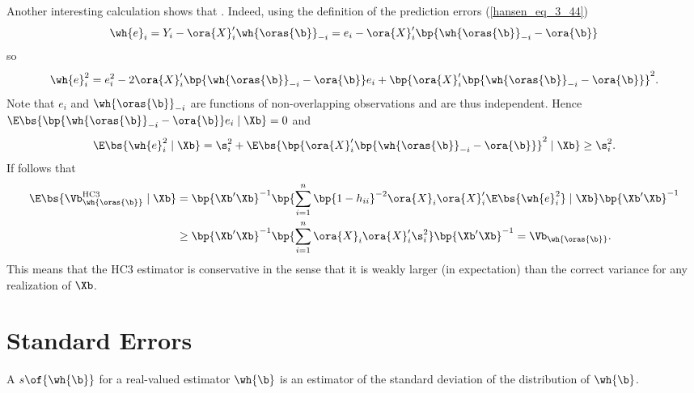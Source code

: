 
Another interesting calculation shows that . Indeed, using the definition of the prediction errors (\ref{hansen_eq_3_44})
\begin{equation}
    \notag
    \wh{e}_i = Y_i - \ora{X}_i^\prime \wh{\oras{\b}}_{-i} = e_i - \ora{X}_i^\prime \bp{\wh{\oras{\b}}_{-i} - \ora{\b}}
\end{equation}
so 
\begin{equation}
    \notag
    \wh{e}_i^2 = e_i^2 - 2 \ora{X}_i^\prime \bp{\wh{\oras{\b}}_{-i} - \ora{\b}} e_i + \bp{\ora{X}_i^\prime \bp{\wh{\oras{\b}}_{-i} - \ora{\b}}}^2.
\end{equation}
Note that $e_i$ and $\wh{\oras{\b}}_{-i}$ are functions of non-overlapping observations and are thus independent. Hence $\E\bs{\bp{\wh{\oras{\b}}_{-i} - \ora{\b}} e_i \mid \Xb} = 0$ and 
\begin{equation}
    \notag
    \E\bs{\wh{e}_i^2 \mid \Xb} = \s_i^2 + \E\bs{\bp{\ora{X}_i^\prime \bp{\wh{\oras{\b}}_{-i} - \ora{\b}}}^2 \mid \Xb} \geq \s_i^2.
\end{equation}
If follows that 
\begin{equation}
    \notag
    \begin{aligned}
        \E\bs{\Vb_{\wh{\oras{\b}}}^{\text{HC3}} \mid \Xb} & = \bp{\Xb^\prime \Xb}^{-1} \bp{\sum_{i=1}^n \bp{1-h_{ii}}^{-2} \ora{X}_i \ora{X}_i^\prime \E\bs{\wh{e}_i^2} \mid \Xb} \bp{\Xb^\prime \Xb}^{-1} \\
        & \geq \bp{\Xb^\prime \Xb}^{-1} \bp{\sum_{i=1}^n \ora{X}_i \ora{X}_i^\prime \s_i^2} \bp{\Xb^\prime \Xb}^{-1} = \Vb_{\wh{\oras{\b}}}.
    \end{aligned}
\end{equation}
This means that the HC3 estimator is conservative in the sense that it is weakly larger (in expectation) than the correct variance for any realization of $\Xb$.

\section{Standard Errors} \label{hansen_sec_4_16}

\setcounter{definition}{1}
\begin{definition} \label{hansen_def_4_2}
    A  $s\of{\wh{\b}}$ for a real-valued estimator $\wh{\b}$ is an estimator of the standard deviation of the distribution of $\wh{\b}$.
\end{definition}

